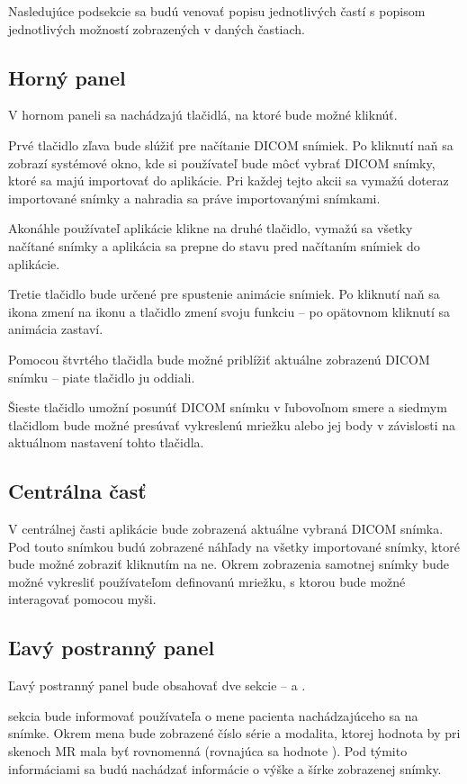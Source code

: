 Nasledujúce podsekcie sa budú venovať popisu jednotlivých častí s popisom jednotlivých možností zobrazených v daných častiach.

\subsection {Horný panel}
V hornom paneli sa nachádzajú tlačidlá, na ktoré bude možné kliknúť.

Prvé tlačidlo zľava bude slúžiť pre načítanie DICOM snímiek. Po kliknutí naň sa zobrazí systémové okno, kde si používateľ bude môcť vybrať DICOM snímky, ktoré sa majú importovať do aplikácie. Pri každej tejto akcii sa vymažú doteraz importované snímky a nahradia sa práve importovanými snímkami.

Akonáhle používateľ aplikácie klikne na druhé tlačidlo, vymažú sa všetky načítané snímky a aplikácia sa prepne do stavu pred načítaním snímiek do aplikácie.

Tretie tlačidlo bude určené pre spustenie animácie snímiek. Po kliknutí naň sa ikona zmení na  ikonu a tlačidlo zmení svoju funkciu -- po opätovnom kliknutí sa animácia zastaví.

Pomocou štvrtého tlačidla bude možné priblížiť aktuálne zobrazenú DICOM snímku -- piate tlačidlo ju oddiali.

Šieste tlačidlo umožní posunúť DICOM snímku v ľubovoľnom smere a siedmym tlačidlom bude možné presúvať vykreslenú mriežku alebo jej body v závislosti na aktuálnom nastavení tohto tlačidla.

\subsection {Centrálna časť}
V centrálnej časti aplikácie bude zobrazená aktuálne vybraná DICOM snímka. Pod touto snímkou budú zobrazené náhľady na všetky importované snímky, ktoré bude možné zobraziť kliknutím na ne. Okrem zobrazenia samotnej snímky bude možné vykresliť používateľom definovanú mriežku, s ktorou bude možné interagovať pomocou myši.

\subsection {Ľavý postranný panel}
Ľavý postranný panel bude obsahovať dve sekcie --  a .

 sekcia bude informovať používateľa o mene pacienta nachádzajúceho sa na snímke. Okrem mena bude zobrazené číslo série a modalita, ktorej hodnota by pri skenoch MR mala byť rovnomenná (rovnajúca sa hodnote ). Pod týmito informáciami sa budú nachádzať informácie o výške a šírke zobrazenej snímky.

